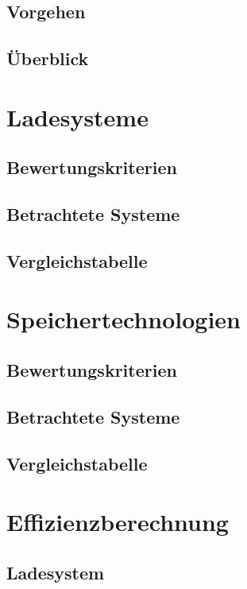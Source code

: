 \documentclass[twoside]{scrreprt}
\begin{document}
\section{Vorgehen} %
\section{Überblick} %

\chapter{Ladesysteme} %
\section{Bewertungskriterien} %
\section{Betrachtete Systeme} %
\section{Vergleichstabelle}   %

\chapter{Speichertechnologien} %
\section{Bewertungskriterien} %
\section{Betrachtete Systeme} %
\section{Vergleichstabelle}   %

\chapter{Effizienzberechnung} %
\section{Ladesystem}
\end{document}
